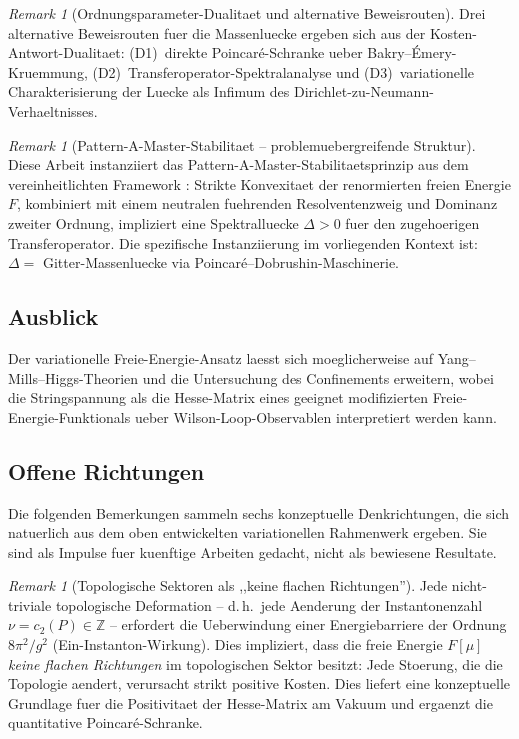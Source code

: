 \documentclass[12pt,a4paper]{article}
\theoremstyle{definition}
\theoremstyle{plain}
\theoremstyle{remark}
\newtheorem{remark}[definition]{Remark}
\begin{document}
\begin{remark}[Ordnungsparameter-Dualitaet und alternative Beweisrouten]
\label{rem:order-parameter-duality}
Drei alternative Beweisrouten fuer die Massenluecke ergeben sich aus der Kosten-Antwort-Dualitaet: (D1)~direkte Poincar\'e-Schranke ueber Bakry--\'Emery-Kruemmung, (D2)~Transferoperator-Spektralanalyse und (D3)~variationelle Charakterisierung der Luecke als Infimum des Dirichlet-zu-Neumann-Verhaeltnisses.
\end{remark}

\begin{remark}[Pattern-A-Master-Stabilitaet -- problemuebergreifende Struktur]
Diese Arbeit instanziiert das Pattern-A-Master-Stabilitaetsprinzip aus dem vereinheitlichten Framework \cite{FST-Unified2026}: Strikte Konvexitaet der renormierten freien Energie $F$, kombiniert mit einem neutralen fuehrenden Resolventenzweig und Dominanz zweiter Ordnung, impliziert eine Spektralluecke $\Delta > 0$ fuer den zugehoerigen Transferoperator. Die spezifische Instanziierung im vorliegenden Kontext ist: $\Delta = $ Gitter-Massenluecke via Poincar\'e--Dobrushin-Maschinerie.
\end{remark}

\subsection{Ausblick}

Der variationelle Freie-Energie-Ansatz laesst sich moeglicherweise auf Yang--Mills--Higgs-Theorien und die Untersuchung des Confinements erweitern, wobei die Stringspannung als die Hesse-Matrix eines geeignet modifizierten Freie-Energie-Funktionals ueber Wilson-Loop-Observablen interpretiert werden kann.


\subsection{Offene Richtungen}

Die folgenden Bemerkungen sammeln sechs konzeptuelle Denkrichtungen, die sich natuerlich aus dem oben entwickelten variationellen Rahmenwerk ergeben. Sie sind als Impulse fuer kuenftige Arbeiten gedacht, nicht als bewiesene Resultate.

\begin{remark}[Topologische Sektoren als ,,keine flachen Richtungen'']
\label{rem:topological-no-flat}
Jede nicht-triviale topologische Deformation -- d.\,h.\ jede Aenderung der Instantonenzahl $\nu = c_2(P) \in \mathbb{Z}$ -- erfordert die Ueberwindung einer Energiebarriere der Ordnung $8\pi^2/g^2$ (Ein-Instanton-Wirkung). Dies impliziert, dass die freie Energie $F[\mu]$ \emph{keine flachen Richtungen} im topologischen Sektor besitzt: Jede Stoerung, die die Topologie aendert, verursacht strikt positive Kosten. Dies liefert eine konzeptuelle Grundlage fuer die Positivitaet der Hesse-Matrix am Vakuum und ergaenzt die quantitative Poincar\'e-Schranke.
\end{remark}
\end{document}
